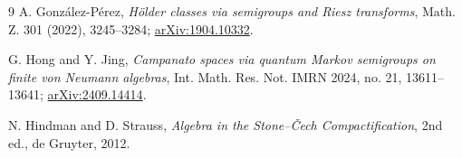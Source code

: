 \documentclass[11pt]{article}
\begin{document}
\begin{thebibliography}{9}
A. Gonz\'alez-P\'erez,
\emph{H\"older classes via semigroups and Riesz transforms},
Math. Z. 301 (2022), 3245--3284;
\href{https://arxiv.org/abs/1904.10332}{arXiv:1904.10332}.

G. Hong and Y. Jing,
\emph{Campanato spaces via quantum Markov semigroups on finite von Neumann
algebras},
Int. Math. Res. Not. IMRN 2024, no. 21, 13611--13641;
\href{https://arxiv.org/abs/2409.14414}{arXiv:2409.14414}.

N. Hindman and D. Strauss,
\emph{Algebra in the Stone--\v{C}ech Compactification}, 2nd ed.,
de Gruyter, 2012.
\end{thebibliography}
\end{document}

